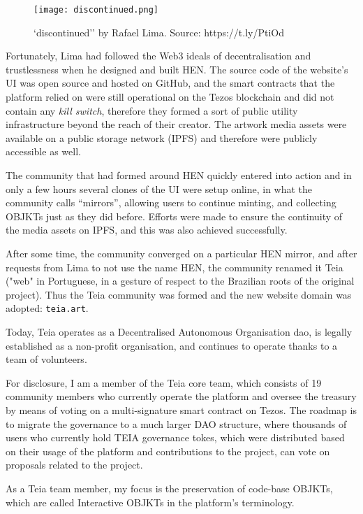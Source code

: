 \begin{figure}[h]
    \centering
    \texttt{[image: discontinued.png]}
    \caption[``discontinued'' by Rafael Lima]{`discontinued'' by Rafael Lima. Source: https://t.ly/PtiOd}
    \label{fig:discontinued}
\end{figure}

Fortunately, Lima had followed the Web3 ideals of decentralisation and trustlessness when he designed and built HEN. The source code of the website's UI was open source and hosted on GitHub, and the smart contracts that the platform relied on were still operational on the Tezos blockchain and did not contain any \emph{kill switch}, therefore they formed a sort of public utility infrastructure beyond the reach of their creator. The artwork media assets were available on a public storage network (IPFS) and therefore were publicly accessible as well.

The community that had formed around HEN quickly entered into action and in only a few hours several clones of the UI were setup online, in what the community calls ``mirrors'', allowing users to continue minting, and collecting OBJKTs just as they did before. Efforts were made to ensure the continuity of the media assets on IPFS, and this was also achieved successfully.

After some time, the community converged on a particular HEN mirror, and after requests from Lima to not use the name HEN, the community renamed it Teia ("web" in Portuguese, in a gesture of respect to the Brazilian roots of the original project). Thus the Teia community was formed and the new website domain was adopted: \texttt{teia.art}.

Today, Teia operates as a Decentralised Autonomous Organisation \gls{dao}, is legally established as a non-profit organisation, and continues to operate thanks to a team of volunteers.

For disclosure, I am a member of the Teia core team, which consists of 19 community members who currently operate the platform and oversee the treasury by means of voting on a multi-signature smart contract on Tezos. The roadmap is to migrate the governance to a much larger DAO structure, where thousands of users who currently hold TEIA governance tokes, which were distributed based on their usage of the platform and contributions to the project, can vote on proposals related to the project.

As a Teia team member, my focus is the preservation of code-base OBJKTs, which are called Interactive OBJKTs in the platform's terminology.

